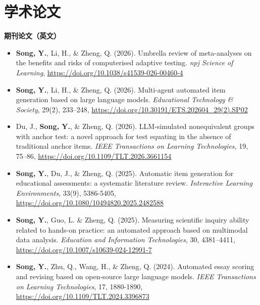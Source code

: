 \documentclass[a4paper,9pt]{extarticle}
\begin{document}
\section*{学术论文}
\noindent
\textbf{期刊论文（英文）}
\begin{itemize}
    \item \textbf{Song, Y.}, Li, H., \& Zheng, Q. (2026). Umbrella review of meta-analyses on the benefits and risks of computerised adaptive testing. \textit{npj Science of Learning}, \url{https://doi.org/10.1038/s41539-026-00460-4}
    \item \textbf{Song, Y.}, Li, H., \& Zheng, Q. (2026). Multi-agent automated item generation based on large language models. \textit{Educational Technology \& Society}, 29(2), 233–248, \url{https://doi.org/10.30191/ETS.202604_29(2).SP02}
    \item Du, J., \textbf{Song, Y.}, \& Zheng, Q. (2026). LLM-simulated nonequivalent groups with anchor test: a novel approach for test equating in the absence of traditional anchor items. \textit{IEEE Transactions on Learning Technologies}, 19, 75–86, \url{https://doi.org/10.1109/TLT.2026.3661154}
    \item \textbf{Song, Y.}, Du, J., \& Zheng, Q. (2025). Automatic item generation for educational assessments: a systematic literature review. \textit{Interactive Learning Environments}, 33(9), 5386-5405, \url{https://doi.org/10.1080/10494820.2025.2482588}
    \item \textbf{Song, Y.}, Guo, L. \& Zheng, Q. (2025). Measuring scientific inquiry ability related to hands-on practice: an automated approach based on multimodal data analysis. \textit{Education and Information Technologies}, 30, 4381–4411, \url{https://doi.org/10.1007/s10639-024-12991-7}
    \item \textbf{Song, Y.}, Zhu, Q., Wang, H., \& Zheng, Q. (2024). Automated essay scoring and revising based on open-source large language models. \textit{IEEE Transactions on Learning Technologies}, 17, 1880-1890, \url{https://doi.org/10.1109/TLT.2024.3396873}
\end{itemize}
\end{document}

